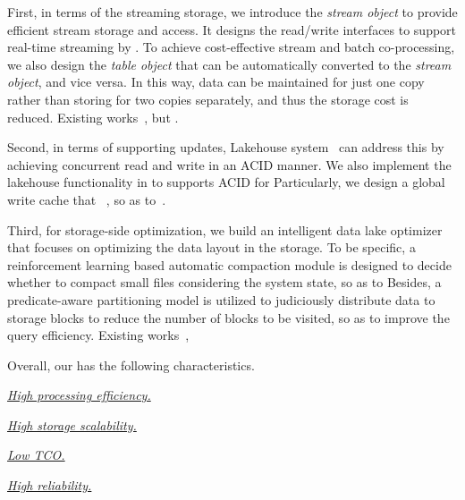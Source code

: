First, in terms of the streaming storage,
 we introduce the \textit{stream object}  to provide efficient stream storage and access. It designs the read/write interfaces to support real-time streaming by . 
To achieve cost-effective stream and batch co-processing, we also design the \textit{table object} that can be automatically converted  to the \textit{stream object}, and vice versa. In this way, data can be maintained for just one copy rather than storing for two copies separately, and thus the storage cost is reduced. 
Existing works~\cc{\cite{}}, but .




Second, in terms of supporting updates, Lakehouse system~\cite{} can address this by achieving concurrent read and write in an ACID manner. We also implement the lakehouse functionality in \sys to supports ACID for  Particularly, we design a global write cache that ~, so as to~.

Third, for storage-side optimization, we build an intelligent data lake optimizer \brain that focuses on optimizing the data layout in the storage.%
 To be specific, a reinforcement learning based automatic compaction module is designed to decide whether to compact small files considering the system state, so as to  Besides, a predicate-aware partitioning model is utilized to judiciously distribute data to storage blocks to reduce the number of blocks to be visited, so as to improve the query efficiency.  Existing works~\cc{\cite{}},

Overall, our \sys has the following characteristics.


\noindent \underline{\textit{High processing efficiency.}} 


\noindent \underline{\textit{High storage scalability.}}


\noindent \underline{\textit{Low TCO.}} 


\noindent \underline{\textit{High reliability.}}

